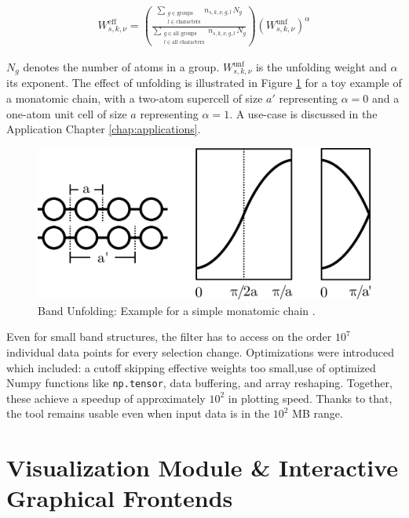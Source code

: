 \begin{align}
  W^{\text{eff}}_{s,k,\nu} = \left( \frac{\sum\limits_{\substack{g \in \text{groups} \\ l \in \text{characters}}} n_{s,k,\nu,g,l}\, N_g}{\sum\limits_{\substack{g \in \text{all groups} \\ l \in \text{all characters}}} n_{s,k,\nu,g,l}\, N_g} \right) \left(W_{s,k,\nu}^{\text{unf}}\right)^\alpha
\label{eq:effective-weight}
\end{align}

\(N_g\) denotes the number of atoms in a group. \(W_{s,k,\nu}^{\text{unf}}\) is
the unfolding weight and \(\alpha\) its exponent. The effect of unfolding is
illustrated in Figure \ref{fig:unfolding} for a toy example of a monatomic
chain, with a two-atom supercell of size \(a'\) representing \(\alpha=0\) and a
one-atom unit cell of size \(a\) representing \(\alpha=1\). A use-case is
discussed in the Application Chapter \ref{chap:applications}.

\begin{figure}[htb!]
    \centering
    \includegraphics[width=0.6\linewidth]{fig/unfolding.png}
    \caption[Band Unfolding]{Band Unfolding: Example for a simple monatomic
      chain \cite{hoffmann1987chemistry}.}
    \label{fig:unfolding}
\end{figure}

Even for small band structures, the filter has to access on the order \(10^7\)
individual data points for every selection change. Optimizations were introduced
which included: a cutoff skipping effective weights too small,use of optimized
Numpy functions like \texttt{np.tensor}, data buffering, and array reshaping.
Together, these achieve a speedup of approximately \(10^2\) in plotting speed.
Thanks to that, the tool remains usable even when input data is in the \(10^2\)
MB range.

\section{Visualization Module \& Interactive Graphical Frontends}
\label{sec:visualization-module}

